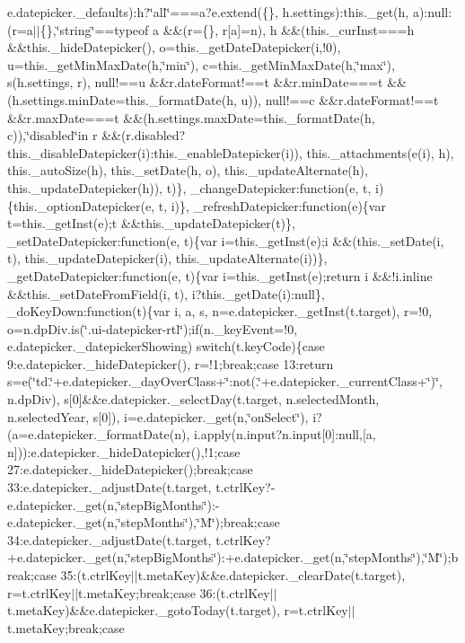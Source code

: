 {{\begin{DoxyParamCaption}
e.\+datepicker.\+\_\+defaults)\+:h?\char`\"{}all\char`\"{}===a?e.\+extend(\{\}, h.\+settings)\+:this.\+\_\+get(h, a)\+:null\+:(r=a$\vert$$\vert$\{\},\char`\"{}string\char`\"{}==typeof a \&\&(r=\{\}, r\mbox{[}a\mbox{]}=n), h \&\&(this.\+\_\+cur\+Inst===h \&\&this.\+\_\+hide\+Datepicker(), o=this.\+\_\+get\+Date\+Datepicker(i,!0), u=this.\+\_\+get\+Min\+Max\+Date(h,\char`\"{}min\char`\"{}), c=this.\+\_\+get\+Min\+Max\+Date(h,\char`\"{}max\char`\"{}), s(h.\+settings, r), null!==u \&\&r.\+date\+Format!==t \&\&r.\+min\+Date===t \&\&(h.\+settings.\+min\+Date=this.\+\_\+format\+Date(h, u)), null!==c \&\&r.\+date\+Format!==t \&\&r.\+max\+Date===t \&\&(h.\+settings.\+max\+Date=this.\+\_\+format\+Date(h, c)),\char`\"{}disabled\char`\"{}in r \&\&(r.\+disabled?this.\+\_\+disable\+Datepicker(i)\+:this.\+\_\+enable\+Datepicker(i)), this.\+\_\+attachments(e(i), h), this.\+\_\+auto\+Size(h), this.\+\_\+set\+Date(h, o), this.\+\_\+update\+Alternate(h), this.\+\_\+update\+Datepicker(h)), t)\}, \+\_\+change\+Datepicker\+:function(e, t, i)\{this.\+\_\+option\+Datepicker(e, t, i)\}, \+\_\+refresh\+Datepicker\+:function(e)\{var t=this.\+\_\+get\+Inst(e);t \&\&this.\+\_\+update\+Datepicker(t)\}, \+\_\+set\+Date\+Datepicker\+:function(e, t)\{var i=this.\+\_\+get\+Inst(e);i \&\&(this.\+\_\+set\+Date(i, t), this.\+\_\+update\+Datepicker(i), this.\+\_\+update\+Alternate(i))\}, \+\_\+get\+Date\+Datepicker\+:function(e, t)\{var i=this.\+\_\+get\+Inst(e);return i \&\&!i.\+inline \&\&this.\+\_\+set\+Date\+From\+Field(i, t), i?this.\+\_\+get\+Date(i)\+:null\}, \+\_\+do\+Key\+Down\+:function(t)\{var i, a, s, n=e.\+datepicker.\+\_\+get\+Inst(t.\+target), r=!0, o=n.\+dp\+Div.\+is(\char`\"{}.\+ui-\/datepicker-\/rtl\char`\"{});if(n.\+\_\+key\+Event=!0, e.\+datepicker.\+\_\+datepicker\+Showing) switch(t.\+key\+Code)\{case 9\+:e.\+datepicker.\+\_\+hide\+Datepicker(), r=!1;break;case 13\+:return s=e(\char`\"{}td.\char`\"{}+e.\+datepicker.\+\_\+day\+Over\+Class+\char`\"{}\+:not(.\char`\"{}+e.\+datepicker.\+\_\+current\+Class+\char`\"{})\char`\"{}, n.\+dp\+Div), s\mbox{[}0\mbox{]}\&\&e.\+datepicker.\+\_\+select\+Day(t.\+target, n.\+selected\+Month, n.\+selected\+Year, s\mbox{[}0\mbox{]}), i=e.\+datepicker.\+\_\+get(n,\char`\"{}on\+Select\char`\"{}), i?(a=e.\+datepicker.\+\_\+format\+Date(n), i.\+apply(n.\+input?n.\+input\mbox{[}0\mbox{]}\+:null,\mbox{[}a, n\mbox{]}))\+:e.\+datepicker.\+\_\+hide\+Datepicker(),!1;case 27\+:e.\+datepicker.\+\_\+hide\+Datepicker();break;case 33\+:e.\+datepicker.\+\_\+adjust\+Date(t.\+target, t.\+ctrl\+Key?-\/e.\+datepicker.\+\_\+get(n,\char`\"{}step\+Big\+Months\char`\"{})\+:-\/e.\+datepicker.\+\_\+get(n,\char`\"{}step\+Months\char`\"{}),\char`\"{}\+M\char`\"{});break;case 34\+:e.\+datepicker.\+\_\+adjust\+Date(t.\+target, t.\+ctrl\+Key?+e.\+datepicker.\+\_\+get(n,\char`\"{}step\+Big\+Months\char`\"{})\+:+e.\+datepicker.\+\_\+get(n,\char`\"{}step\+Months\char`\"{}),\char`\"{}\+M\char`\"{});break;case 35\+:(t.\+ctrl\+Key$\vert$$\vert$t.\+meta\+Key)\&\&e.\+datepicker.\+\_\+clear\+Date(t.\+target), r=t.\+ctrl\+Key$\vert$$\vert$t.\+meta\+Key;break;case 36\+:(t.\+ctrl\+Key$\vert$$\vert$t.\+meta\+Key)\&\&e.\+datepicker.\+\_\+goto\+Today(t.\+target), r=t.\+ctrl\+Key$\vert$$\vert$t.\+meta\+Key;break;case 
\end{DoxyParamCaption}}}
